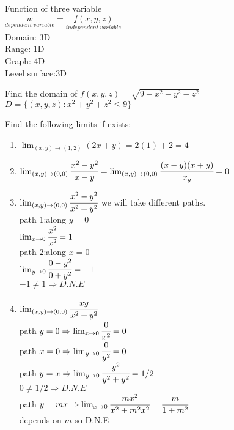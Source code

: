\noindent{\color{smalt(darkpowderblue)}\rule{\linewidth}{.2mm}}
\begin{definition}
Function of three variable \\
$\underset{dependent~variable}{w}=\underset{independent~variable}{f(x,y,z)}$\\
Domain: 3D\\
Range: 1D\\
Graph: 4D\\
Level surface:3D
\end{definition}
\begin{example}
Find the domain of $f(x,y,z)=\sqrt{9-x^2-y^2-z^2}$\\
$D=\{(x,y,z):x^2+y^2+z^2\leq9\}$
\end{example}
\noindent{\color{smalt(darkpowderblue)}\rule{\linewidth}{.2mm}}
\begin{example}
Find the following limits if exists:\\
\begin{enumerate}
    \item $\lim_{(x,y)\to (1,2)}(2x+y)=2(1)+2=4$
    \item $\lim_{(x,y)\to(0,0)}\cfrac{x^2-y^2}{x-y}=\lim_{(x,y)\to (0,0)}\cfrac{(x-y)(x+y)}{x_y}=0$
    \item $\lim_{(x,y)\to (0,0)}\cfrac{x^2-y^2}{x^2+y^2}$ we will take different paths.\\
    path 1:along $y=0$\\
    $\lim_{x\to 0}\cfrac{x^2}{x^2}=1$\\
    path 2:along $x=0$\\
    $\lim_{y\to 0}\cfrac{0-y^2}{0+y^2}=-1$\\
    $-1\neq 1\Rightarrow D.N.E$
    \item $\lim_{(x,y)\to (0,0)}\cfrac{xy}{x^2+y^2}$\\
    path $y=0\Rightarrow \lim_{x\to 0}\cfrac{0}{x^2}=0$\\
    path $x=0\Rightarrow \lim_{y\to0}\cfrac{0}{y^2}=0$\\
    path $y=x\Rightarrow \lim_{y\to 0}\cfrac{y^2}{y^2+y^2}=1/2$\\
    $0\neq 1/2\Rightarrow D.N.E$\\
    path $y=mx\Rightarrow\lim_{x\to 0}\cfrac{mx^2}{x^2+m^2x^2}=\cfrac{m}{1+m^2}$\\
    depends on $m$
    so D.N.E
\end{enumerate}
\end{example}
